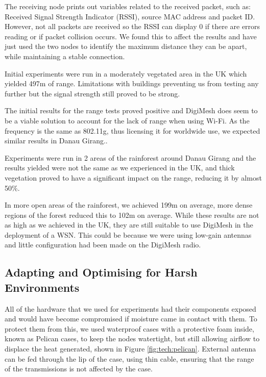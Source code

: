 The receiving node prints out variables related to the received packet, such as: Received Signal Strength Indicator (RSSI), source MAC address and packet ID. However, not all packets are received so the RSSI can display 0 if there are errors reading or if packet collision occurs. We found this to affect the results and have just used the two nodes to identify the maximum distance they can be apart, while maintaining a stable connection.
					
Initial experiments were run in a moderately vegetated area in the UK which yielded 497m of range. Limitations with buildings preventing us from testing any further but the signal strength still proved to be strong.
			
The initial results for the range tests proved positive and DigiMesh does seem to be a viable solution to account for the lack of range when using Wi-Fi. As the frequency is the same as 802.11g, thus licensing it for worldwide use, we expected similar results in Danau Girang..
						
Experiments were run in 2 areas of the rainforest around Danau Girang and the results yielded were not the same as we experienced in the UK, and thick vegetation proved to have a significant impact on the range, reducing it by almost 50\%.
			
In more open areas of the rainforest, we achieved 199m on average, more dense regions of the forest reduced this to 102m on average. While these results are not as high as we achieved in the UK, they are still suitable to use DigiMesh in the deployment of a WSN. This could be because we were using low-gain antennas and little configuration had been made on the DigiMesh radio.

\subsection{Adapting and Optimising for Harsh Environments}
	All of the hardware that we used for experiments had their components exposed and would have become compromised if moisture came in contact with them. To protect them from this, we used waterproof cases with a protective foam inside, known as Pelican cases, to keep the nodes watertight, but still allowing airflow to displace the heat generated, shown in Figure \ref{fig:tech:pelican}.
	External antenna can be fed through the lip of the case, using thin cable, ensuring that the range of the transmissions is not affected by the case. 

